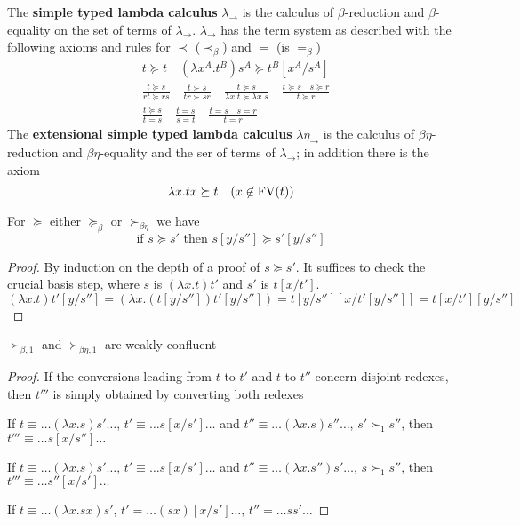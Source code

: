 \documentclass[11pt]{article}
\begin{document}
\begin{definition}[]
The \textbf{simple typed lambda calculus} \(\lambda_\to\) is the calculus of
\(\beta\)-reduction and \(\beta\)-equality on the set of terms of \(\lambda_\to\).
\(\lambda_\to\) has the term system as described with the following axioms and
rules for \(\prec\) (\(\prec_\beta\)) and \(=\) (is \(=_\beta\))
\begin{align*}
&t\succeq t\quad(\lambda x^A.t^B)s^A\succeq t^B[x^A/s^A]\\
&\frac{t\succeq s}{rt\succeq rs}\quad
\frac{t\succ s}{tr\succ sr}\quad
\frac{t\succeq s}{\lambda x.t\succeq\lambda x.s}\quad
\frac{t\succeq s\quad s\succeq r}{t\succeq r}\\
&\frac{t\succeq s}{t=s}\quad\frac{t=s}{s=t}\quad
\frac{t=s\quad s=r}{t=r}
\end{align*}
The \textbf{extensional simple typed lambda calculus} \(\lambda\eta_\to\) is the
calculus of \(\beta \eta\)-reduction and \(\beta \eta\)-equality and the ser of terms
of \(\lambda_\to\); in addition there is the axiom
\begin{equation*}
\lambda x.tx\succeq t\quad(x\not\in\text{FV}(t))
\end{equation*}
\end{definition}

\begin{lemma}
For \(\succeq\) either \(\succeq_\beta\) or \(\succ_{\beta\eta}\) we have
\begin{equation*}
\text{if } s\succeq s' \text{ then } s[y/s'']\succeq s'[y/s'']
\end{equation*}
\end{lemma}
\begin{proof}
By induction on the depth of a proof of \(s\succeq s'\). It suffices to check
the crucial basis step, where \(s\) is \((\lambda x.t)t'\) and \(s'\) is \(t[x/t']\).
\begin{equation*}
(\lambda x.t)t'[y/s'']=(\lambda x.(t[y/s''])t'[y/s''])=
t[y/s''][x/t'[y/s'']]=t[x/t'][y/s'']
\end{equation*}
\end{proof}

\begin{proposition}[]
\(\succ_{\beta,1}\) and \(\succ_{\beta\eta,1}\) are weakly confluent
\end{proposition}
\begin{proof}
If the conversions leading from \(t\) to \(t'\) and \(t\) to \(t''\) concern disjoint
redexes, then \(t'''\) is simply obtained by converting both redexes

If \(t\equiv\dots(\lambda x.s)s'\dots\), \(t'\equiv\dots s[x/s']\dots\) and
\(t''\equiv\dots(\lambda x.s)s''\dots\), \(s'\succ_1 s''\), then \(t'''\equiv\dots
   s[x/s'']\dots\)

If \(t\equiv\dots(\lambda x.s)s'\dots\), \(t'\equiv\dots s[x/s']\dots\) and
\(t''\equiv\dots(\lambda x.s'')s'\dots\), \(s\succ_1 s''\), then \(t'''\equiv\dots
   s''[x/s']\dots\)

If \(t\equiv\dots(\lambda x.sx)s'\), \(t'=\dots (sx)[x/s']\dots\),
\(t''\equal\dots ss'\dots\)
\end{proof}
\end{document}
